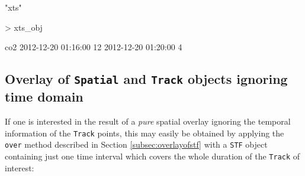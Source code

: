 \documentclass[12pt, oneside, a4paper]{scrbook}
\let\code=\texttt
\newcommand{\codeintitles}[1]{{\tt #1}} %
\begin{document}
\begin{small}
\begin{Schunk}
\begin{Soutput}
[1] "xts"
\end{Soutput}
\begin{Sinput}
> xts_obj
\end{Sinput}
\begin{Soutput}
                    co2
2012-12-20 01:16:00  12
2012-12-20 01:20:00   4
\end{Soutput}
\end{Schunk}
\end{small}



\subsection[Overlay of \codeintitles{Spatial} and \codeintitles{Track} objects ignoring time domain]{Overlay of \codeintitles{Spatial} and \codeintitles{Track} objects ignoring time domain}
\label{subsec:overlayofspatialigntime}

If one is interested in the result of a \textit{pure} spatial overlay ignoring the temporal information of the \code{Track} points, this may easily be obtained by applying the \code{over} method described in Section \ref{subsec:overlayofstf} with a \code{STF} object containing just one time interval which covers the whole duration of the \code{Track} of interest:
\end{document}
